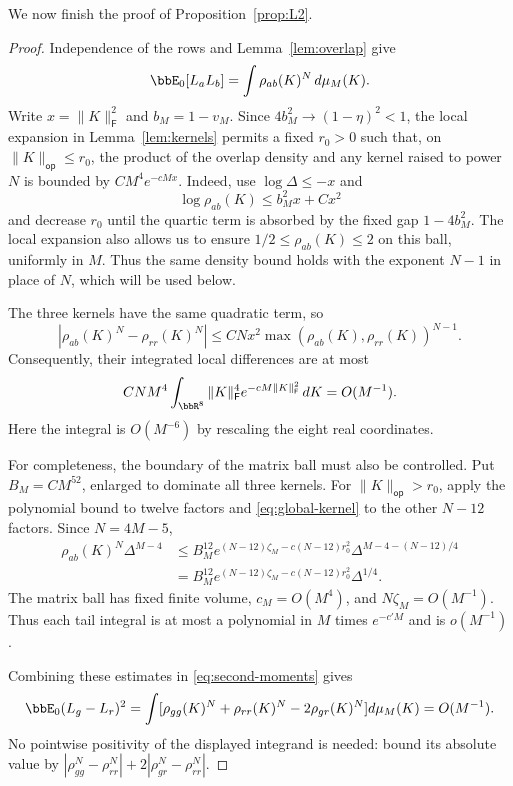 \documentclass[11pt,reqno]{amsart}
\begin{document}
We now finish the proof of Proposition~\ref{prop:L2}.
\begin{proof}
Independence of the rows and Lemma~\ref{lem:overlap} give
\begin{equation}\label{eq:second-moments}
 \bbE_0[L_aL_b]=\int\rho_{ab}(K)^N\,d\mu_M(K).
\end{equation}
Write $x=\|K\|_{\mathsf{F}}^2$ and $b_M=1-v_M$. Since $4b_M^2\to(1-\eta)^2<1$, the local expansion in Lemma~\ref{lem:kernels} permits a fixed $r_0>0$ such that, on $\|K\|_{\mathsf{op}}\le r_0$, the product of the overlap density and any kernel raised to power $N$ is bounded by $CM^4e^{-cMx}$. Indeed, use $\log\Delta\le-x$ and
\[
 \log\rho_{ab}(K)\le b_M^2x+Cx^2
\]
and decrease $r_0$ until the quartic term is absorbed by the fixed gap $1-4b_M^2$. The local expansion also allows us to ensure $1/2\le\rho_{ab}(K)\le2$ on this ball, uniformly in $M$. Thus the same density bound holds with the exponent $N-1$ in place of $N$, which will be used below.

The three kernels have the same quadratic term, so
\[
 |\rho_{ab}(K)^N-\rho_{rr}(K)^N|
 \le CNx^2\max(\rho_{ab}(K),\rho_{rr}(K))^{N-1}.
\]
Consequently, their integrated local differences are at most
\[
 CNM^4\int_{\bbR^8}\|K\|_{\mathsf{F}}^4e^{-cM\|K\|_{\mathsf{F}}^2}\,dK
 =O(M^{-1}).
\]
Here the integral is $O(M^{-6})$ by rescaling the eight real coordinates.

For completeness, the boundary of the matrix ball must also be controlled. Put $B_M=CM^{52}$, enlarged to dominate all three kernels. For $\|K\|_{\mathsf{op}}>r_0$, apply the polynomial bound to twelve factors and \eqref{eq:global-kernel} to the other $N-12$ factors. Since $N=4M-5$,
\begin{align*}
 \rho_{ab}(K)^N\Delta^{M-4}
 &\le B_M^{12}
 e^{(N-12)\zeta_M-c(N-12)r_0^2}
 \Delta^{M-4-(N-12)/4}\\
 &=B_M^{12}
 e^{(N-12)\zeta_M-c(N-12)r_0^2}\Delta^{1/4}.
\end{align*}
The matrix ball has fixed finite volume, $c_M=O(M^4)$, and $N\zeta_M=O(M^{-1})$. Thus each tail integral is at most a polynomial in $M$ times $e^{-c'M}$ and is $o(M^{-1})$.

Combining these estimates in \eqref{eq:second-moments} gives
\[
 \bbE_0(L_g-L_r)^2
 =\int[\rho_{gg}(K)^N+\rho_{rr}(K)^N-2\rho_{gr}(K)^N]d\mu_M(K)
 =O(M^{-1}).
\]
No pointwise positivity of the displayed integrand is needed: bound its absolute value by
$|\rho_{gg}^N-\rho_{rr}^N|+2|\rho_{gr}^N-\rho_{rr}^N|$.
\end{proof}
\end{document}
